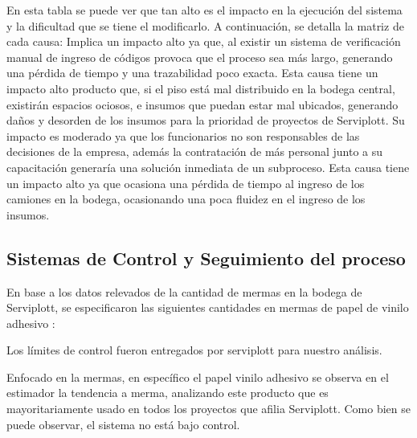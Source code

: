 	En esta tabla se puede ver que tan alto es el impacto en la ejecución del sistema y la
dificultad que se tiene el modificarlo. A continuación, se detalla la matriz de cada
causa:
 Implica un impacto alto ya que, al existir un sistema de
verificación manual de ingreso de códigos provoca que el proceso sea más largo,
generando una pérdida de tiempo y una trazabilidad poco exacta.
 Esta causa tiene un impacto alto
producto que, si el piso está mal distribuido en la bodega central, existirán espacios
ociosos, e insumos que puedan estar mal ubicados, generando daños y desorden de
los insumos para la prioridad de proyectos de Serviplott.
 Su impacto es moderado ya que los funcionarios no son
responsables de las decisiones de la empresa, además la contratación de más
personal junto a su capacitación generaría una solución inmediata de un subproceso.
 Esta causa tiene un impacto alto ya que ocasiona una pérdida de tiempo
al ingreso de los camiones en la bodega, ocasionando una poca fluidez en el ingreso
de los insumos.


	\subsection{Sistemas de Control y Seguimiento del proceso}
	
	
	En base a los datos relevados de la cantidad de mermas en la bodega de Serviplott,
se especificaron las siguientes cantidades en mermas de papel de vinilo adhesivo :
	

	
	Los límites de control fueron entregados por serviplott para nuestro análisis.
	


	
	Enfocado en la mermas, en específico el papel vinilo adhesivo se observa en
el estimador la tendencia a merma, analizando este producto que es mayoritariamente
usado en todos los proyectos que afilia Serviplott. Como bien se puede observar, el
sistema no está bajo control.

